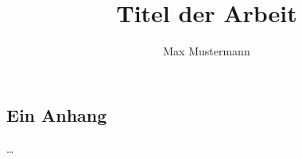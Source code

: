 \documentclass[
		master, %
		german, %
		vlba, %
		nomencl, %
		hyperref,
	]{mrcc}
\author{Max Mustermann}
\title{Titel der Arbeit}
\begin{document}
	
	
	\begin{appendix}
		\chapter{Ein Anhang}
		\dots{}
	\end{appendix}
\end{document}
